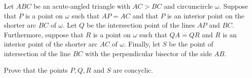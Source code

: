 Let $ABC$ be an acute-angled triangle with $AC>BC$  and circumcircle $\omega$. Suppose that $P$ is a point on $\omega$ such that $AP=AC$ and that $P$ is an interior point on the shorter arc $BC$ of $\omega$. Let $Q$ be the intersection point of the lines $AP$ and $BC$. Furthermore, suppose that $R$ is a point on $\omega$ such that $QA=QR$ and $R$ is an interior point of the shorter arc $AC$ of $\omega$. Finally, let $S$ be the point of intersection of the line $BC$ with the perpendicular bisector of the side $AB$.

Prove that the points $P, Q, R$ and $S$ are concyclic.